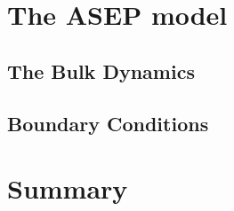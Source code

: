 
\section{The ASEP model}
\label{sec:the_asep_model}

\subsection{The Bulk Dynamics}
\label{sub:the_bulk_dynamics}

\subsection{Boundary Conditions}
\label{sub:boundary_conditions}



\section{Summary}
\label{sec:summary}


